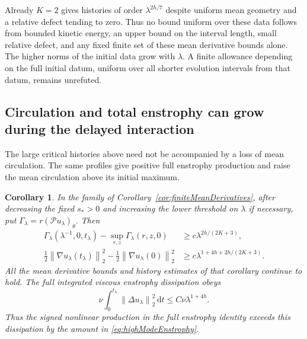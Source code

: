 \documentclass[11pt]{article}
\newtheorem{corollary}[theorem]{Corollary}
\theoremstyle{remark}
\newcommand{\PP}{\mathcal P}
\newcommand{\dd}{\,\mathrm d}
\newcommand{\norm}[1]{\left\lVert#1\right\rVert}
\begin{document}
Already $K=2$ gives histories of order $\lambda^{2h/7}$ despite
uniform mean geometry and a relative defect tending to zero.
Thus no bound uniform over these data follows from bounded kinetic
energy, an upper bound on the interval length, small relative defect,
and any fixed finite set of these mean derivative bounds alone.
The higher norms of the initial data grow with $\lambda$.
A finite allowance depending on the full initial datum, uniform over
all shorter evolution intervals from that datum, remains unrefuted.

\subsection{Circulation and total enstrophy can grow during the delayed interaction}

The large critical histories above need not be accompanied by a loss
of mean circulation. The same profiles give positive full enstrophy
production and raise the mean circulation above its initial maximum.

\begin{corollary}\label{cor:highModeSimultaneous}
In the family of Corollary~\ref{cor:finiteMeanDerivatives}, after
decreasing the fixed $s_*>0$ and increasing the lower threshold on
$\lambda$ if necessary, put $\Gamma_\lambda=r(\PP u_\lambda)_\theta$.
Then
\begin{align}
 \Gamma_\lambda(\lambda^{-1},0,t_\lambda)
       -\sup_{r,z}\Gamma_\lambda(r,z,0)
      &\geq c\lambda^{2h/(2K+3)},\label{eq:highModeCirculation}\\
 \tfrac12\norm{\nabla u_\lambda(t_\lambda)}_2^2
       -\tfrac12\norm{\nabla u_\lambda(0)}_2^2
      &\geq c\lambda^{1+4h+2h/(2K+3)}.\label{eq:highModeEnstrophy}
\end{align}
All the mean derivative bounds and history estimates of that corollary
continue to hold. The full integrated viscous enstrophy dissipation obeys
\[
 \nu\int_0^{t_\lambda}\norm{\Delta u_\lambda}_2^2\dd t
                              \leq C\nu\lambda^{1+4h}.
\]
Thus the signed nonlinear production in the full enstrophy identity
exceeds this dissipation by the amount in \eqref{eq:highModeEnstrophy}.
\end{corollary}
\end{document}
